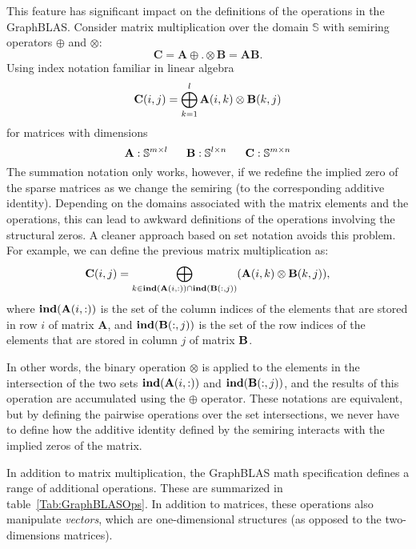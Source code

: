 This feature has significant impact on the definitions of the operations in the GraphBLAS.   
Consider matrix multiplication over the domain $\mathbb{S}$ 
with semiring operators 
$\oplus$ and $\otimes$:
 $$
   \mathbf{C} = \mathbf{A} {\oplus}.{\otimes} \mathbf{B} = \mathbf{A} \mathbf{B}.
$$
Using index notation familiar in linear algebra
  $$
   {\bf C}(i,j) = \bigoplus_{k=1}^l {\bf A}(i,k) \otimes {\bf B}(k,j)
  $$
for matrices with dimensions
$$
  {\bf A} : \mathbb{S}^{m \times l} ~~~~~
  {\bf B} : \mathbb{S}^{l \times n} ~~~~~
  {\bf C} : \mathbb{S}^{m \times n}
$$
The summation notation only works, however, if we redefine the implied zero of the 
sparse matrices as we change the semiring (to the corresponding additive identity).   
Depending on the domains associated with the
matrix elements and the operations, this can lead to awkward definitions of the
operations involving the structural zeros.  A cleaner approach based on set notation
avoids this problem.  For example, we can define the previous matrix multiplication
as:   
$$
\mathbf{C}(i,j)
= \bigoplus_{k \in \mathbf{ind}({\bf {A}}(i,:)) \cap
\mathbf{ind}({\bf {B}}(:,j))} ({\bf {A}}(i,k)
\otimes {\bf {B}}(k,j)),
$$ 
where $\mathbf{ind}({\bf {A}}(i,:))$ is the set of the column indices of the 
elements that are stored in row $i$ of matrix $\mathbf{A}$, and
$\mathbf{ind}({\bf {B}}(:,j))$ is the set of the row indices of the 
elements that are stored in column $j$ of matrix ${\bf B}$.

In other words, the binary operation $\otimes$ is applied to the elements in the intersection of the 
two sets $\mathbf{ind}({\bf {A}}(i,:))$ and $\mathbf{ind}({\bf {B}}(:,j))$, 
and the results of this operation are accumulated using the $\oplus$ operator.
These notations are equivalent, but by defining the pairwise operations over
the set intersections, we never have to define how the additive identity defined by 
the semiring interacts with the implied zeros of the matrix.

In addition to matrix multiplication, the GraphBLAS math specification defines
a range of additional operations.  These are summarized in table~\ref{Tab:GraphBLASOps}.
In addition to matrices, these operations also manipulate \emph{vectors}, which are
one-dimensional structures (as opposed to the two-dimensions matrices).


